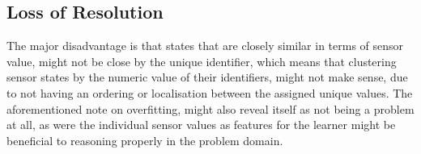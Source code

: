 \subsection{Loss of Resolution}
The major disadvantage is that states that are closely similar in terms of sensor value, might not be close by the unique identifier, which means that clustering sensor states by the numeric value of their identifiers, might not make sense, due to not having an ordering or localisation between the assigned unique values.
The aforementioned note on overfitting, might also reveal itself as not being a problem at all, as were the individual sensor values as features for the learner might be beneficial to reasoning properly in the problem domain.
